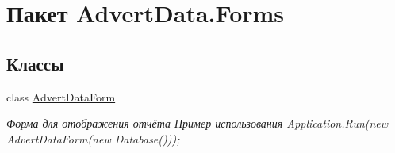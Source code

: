 \hypertarget{namespace_advert_data_1_1_forms}{\section{Пакет Advert\+Data.\+Forms}
\label{namespace_advert_data_1_1_forms}
}
\subsection*{Классы}
\begin{DoxyCompactItemize}
\item 
class \hyperlink{class_advert_data_1_1_forms_1_1_advert_data_form}{Advert\+Data\+Form}
\begin{DoxyCompactList}\small\item\em Форма для отображения отчёта Пример использования Application.\+Run(new Advert\+Data\+Form(new Database())); \end{DoxyCompactList}\end{DoxyCompactItemize}
